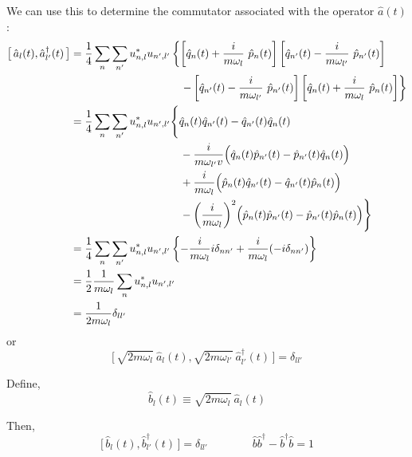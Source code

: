 \documentclass{article}
\begin{document}
\noindent We can use this to determine the commutator associated with the operator $\hat{a}(t)$:
\begin{align*}
       \big[\, \hat{a}_l (t), \hat{a}^\dagger _{l'}(t) \,\big] &= \frac{1}{4} \sum_n \sum_{n'} u^* _{n,l} u_{n',l'} \left\lbrace \left[ \hat{q}_n(t) + \frac{i}{ m \omega_l } ~ \hat{p}_n (t) \right] \left[ \hat{q}_{n'}(t) - \frac{i}{ m \omega_{l'} } ~ \hat{p}_{n'}(t) \right] \right. \\
       &\hspace{1.4in} \left. - \left[ \hat{q}_{n'}(t) - \frac{i}{ m \omega_{l'} } ~ \hat{p}_{n'}(t) \right] \left[ \hat{q}_n(t) + \frac{i}{ m \omega_l } ~ \hat{p}_n (t) \right] \right\rbrace \\
       &= \frac{1}{4} \sum_n \sum_{n'}u^*_{ n, l } u_{ n', l' } \Bigg\lbrace \hat{q}_n (t) \hat{q}_{n'} (t) - \hat{q}_{n'} (t) \hat{q}_n (t) \\
       &\hspace{1.4in} - \frac{i}{ m \omega_{l'}v  } \Big( \hat{q}_n (t)\hat{p}_{n'} (t) - \hat{p}_{n'}(t) \hat{q}_n (t) \Big) \\
       &\hspace{1.4in} + \frac{i}{m\omega_l} \Big( \hat{p}_n (t)\hat{q}_{n'} (t) - \hat{q}_{n'}(t) \hat{p}_n (t) \Big) \\
       &\hspace{1.4in} - { \left( \frac{i}{m\omega_l} \right) }^2 \Big( \hat{p}_n (t)\hat{p}_{n'} (t) - \hat{p}_{n'}(t) \hat{p}_n (t) \Big) \Bigg\rbrace \\
       &= \frac{1}{4} \sum_n \sum_{n'}u^* _{n,l} u_{n',l'} \left \{ -\frac{i}{m \omega_l} i \delta_{nn'} + \frac{i}{m\omega_l} (-i \delta_{nn'})\right \} \\ 
       &= \frac{1}{2} \frac{1}{m \omega_l} \sum_{n}u^* _{n,l} u_{n',l'} \\ 
       &= \frac{1}{2m\omega_l} \delta_{ll'}
\end{align*}
or
\begin{equation*}
    \big[\, \sqrt{ 2m \omega_l } ~ \hat{a}_l (t), \sqrt{ 2m \omega_{l'} } ~ \hat{a}^\dagger_{l'} (t) \,\big] = \delta_{ll'}
\end{equation*}

\noindent Define, 
\begin{equation*}
    \hat{b}_l (t) \equiv \sqrt{2m\omega_l} ~ \hat{a}_l (t)
\end{equation*}

\noindent Then,
\begin{equation*}
    \big[\, \hat{b}_l (t), \hat{b}^\dagger _{l'} (t) \,\big] = \delta_{ll'} %
    \qquad \qquad \hat{b} \hat{b}^\dagger - \hat{b}^\dagger \hat{b} = 1  
\end{equation*}
\end{document}
